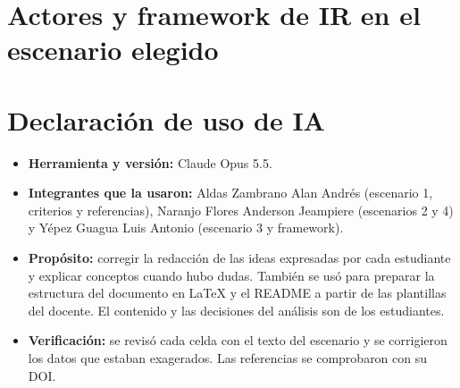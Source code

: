 \documentclass[11pt,a4paper]{article}
\begin{document}
\section{Actores y framework de IR en el escenario elegido}


\section{Declaración de uso de IA}

\begin{itemize}
  \item \textbf{Herramienta y versión:} Claude Opus 5.5.
  \item \textbf{Integrantes que la usaron:} Aldas Zambrano Alan Andrés (escenario 1, criterios y referencias), Naranjo Flores Anderson Jeampiere (escenarios 2 y 4) y Yépez Guagua Luis Antonio (escenario 3 y framework).
  \item \textbf{Propósito:} corregir la redacción de las ideas expresadas por cada estudiante y explicar conceptos cuando hubo dudas. También se usó para preparar la estructura del documento en \LaTeX{} y el README a partir de las plantillas del docente. El contenido y las decisiones del análisis son de los estudiantes.
  \item \textbf{Verificación:} se revisó cada celda con el texto del escenario y se corrigieron los datos que estaban exagerados. Las referencias se comprobaron con su DOI.
\end{itemize}



\end{document}
